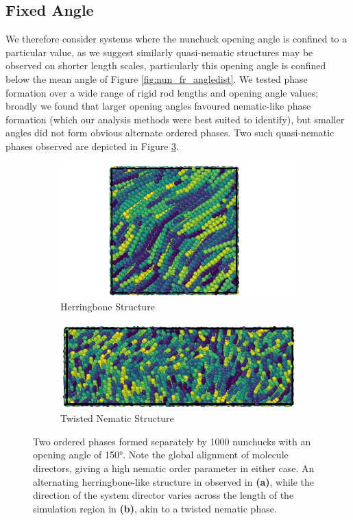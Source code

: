 \documentclass[11pt, a4paper]{article} %
\begin{document}
\subsection{Fixed Angle}
We therefore consider systems where the nunchuck opening angle is confined to a particular value, as we suggest similarly quasi-nematic structures may be observed on shorter length scales,  particularly this opening angle is confined below the mean angle of Figure \ref{fig:nun_fr_angledist}.
We tested phase formation over a wide range of rigid rod lengths and opening angle values; broadly we found that larger opening angles favoured nematic-like phase formation (which our analysis methods were best suited to identify), but smaller angles did not form obvious alternate ordered phases. Two such quasi-nematic phases observed are depicted in Figure \ref{fig:nun_fa_views}.

\begin{figure}
	\vspace{0.5cm}
	\centering
	\begin{subfigure}{.4\textwidth}
		\centering
		\includegraphics[width=.9\linewidth]{Figures/nun_fa_herringbone}
		\caption{Herringbone Structure}
		\label{fig:nun_fa_herringbone}
	\end{subfigure}%
	\begin{subfigure}{.6\textwidth}
		\centering
		\includegraphics[width=.9\linewidth]{Figures/nun_fa_twist}
		\caption{Twisted Nematic Structure}
		\label{fig:nun_fa_twist}
	\end{subfigure}
	\caption{Two ordered phases formed separately by \num{1000} nunchucks with an opening angle of \ang{150}. Note the global alignment of molecule directors, giving a high nematic order parameter in either case. An alternating herringbone-like structure in observed in \textbf{(a)}, while the direction of the system director varies across the length of the simulation region in \textbf{(b)}, akin to a twisted nematic phase.}
	\label{fig:nun_fa_views}
\end{figure}
\end{document}
